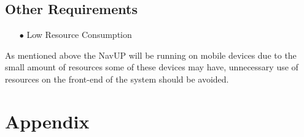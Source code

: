 \documentclass[a4paper,12pt]{article}
\begin{document}
 
\subsection{Other Requirements}
	\begin{itemize} \item[$\bullet$] Low Resource Consumption \end{itemize}
		
		As mentioned above the NavUP will be running on mobile devices due to the small amount of resources some of these devices
		may have, unnecessary use of resources on the front-end of the system should be avoided.
	
\section{Appendix}
\newpage
\end{document}
